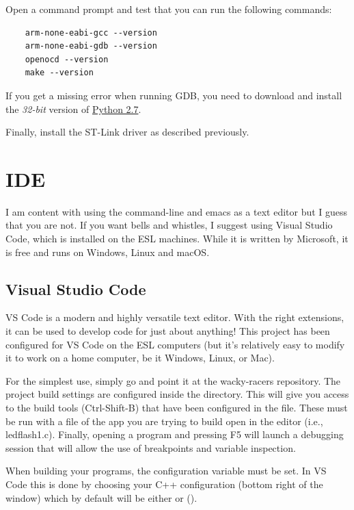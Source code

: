 Open a command prompt and test that you can run the following commands:
\begin{verbatim}
    arm-none-eabi-gcc --version
    arm-none-eabi-gdb --version
    openocd --version
    make --version
\end{verbatim}
If you get a missing  error when running GDB, you need to
download and install the \emph{32-bit} version of
\href{https://www.python.org/downloads/release/python-2718/}{Python 2.7}.

Finally, install the ST-Link driver as described previously.

\section{IDE}

I am content with using the command-line and emacs as a text editor but I
guess that you are not.  If you want bells and whistles, I suggest using
Visual Studio Code, which is installed on the ESL machines.  While it is
written by Microsoft, it is free and runs on Windows, Linux and macOS.


\subsection{Visual Studio Code}

VS Code is a modern and highly versatile text editor.  With the right
extensions, it can be used to develop code for just about anything!
This project has been configured for VS Code on the ESL computers (but
it's relatively easy to modify it to work on a home computer, be it
Windows, Linux, or Mac).

For the simplest use, simply go  and point
it at the wacky-racers repository. The project build settings are
configured inside the  directory. This will give you
access to the build tools (Ctrl-Shift-B) that have been configured in
the  file. These must be run with a file of
the app you are trying to build open in the editor (i.e.,
ledflash1.c). Finally, opening a program and pressing F5 will launch a
debugging session that will allow the use of breakpoints and variable
inspection.

When building your programs, the  configuration variable
must be set. In VS Code this is done by choosing your C++
configuration (bottom right of the window) which by default will be
either  or  ().

